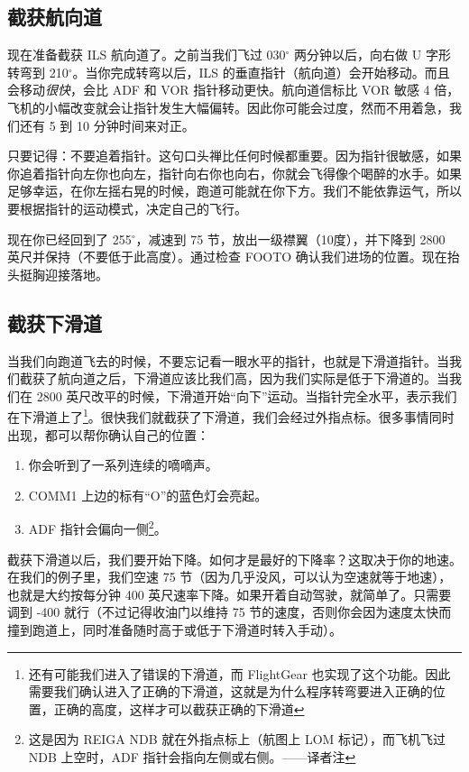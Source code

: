 \subsection{截获航向道}

现在准备截获 ILS 航向道了。之前当我们飞过 030$^\circ$ 两分钟以后，向右做 U 字形转弯到 210$^\circ$。当你完成转弯以后，ILS 的垂直指针（航向道）会开始移动。而且会移动\emph{很快}，会比 ADF 和 VOR 指针移动更快。航向道信标比 VOR 敏感 4 倍，飞机的小幅改变就会让指针发生大幅偏转。因此你可能会过度，然而不用着急，我们还有 5 到 10 分钟时间来对正。

只要记得：不要追着指针。这句口头禅比任何时候都重要。因为指针很敏感，如果你追着指针向左你也向左，指针向右你也向右，你就会飞得像个喝醉的水手。如果足够幸运，在你左摇右晃的时候，跑道可能就在你下方。我们不能依靠运气，所以要根据指针的运动模式，决定自己的飞行。

现在你已经回到了 255$^\circ$，减速到 75 节，放出一级襟翼（10度），并下降到 2800 英尺并保持（不要低于此高度）。通过检查 FOOTO 确认我们进场的位置。现在抬头挺胸迎接落地。

\subsection{截获下滑道}

当我们向跑道飞去的时候，不要忘记看一眼水平的指针，也就是下滑道指针。当我们截获了航向道之后，下滑道应该比我们高，因为我们实际是低于下滑道的。当我们在 2800 英尺改平的时候，下滑道开始“向下”运动。当指针完全水平，表示我们在下滑道上了\footnote{还有可能我们进入了错误的下滑道，而 FlightGear 也实现了这个功能。因此需要我们确认进入了正确的下滑道，这就是为什么程序转弯要进入正确的位置，正确的高度，这样才可以截获正确的下滑道}。很快我们就截获了下滑道，我们会经过外指点标。很多事情同时出现，都可以帮你确认自己的位置：

\begin{enumerate}
\item 你会听到了一系列连续的嘀嘀声。
\item COMM1 上边的标有“O”的蓝色灯会亮起。
\item ADF 指针会偏向一侧\footnote{这是因为 REIGA NDB 就在外指点标上（航图上 LOM 标记），而飞机飞过 NDB 上空时，ADF 指针会指向左侧或右侧。——译者注}。
\end{enumerate}

截获下滑道以后，我们要开始下降。如何才是最好的下降率？这取决于你的地速。在我们的例子里，我们空速 75 节（因为几乎没风，可以认为空速就等于地速），也就是大约按每分钟 400 英尺速率下降。如果开着自动驾驶，就简单了。只需要调到 -400 就行（不过记得收油门以维持 75 节的速度，否则你会因为速度太快而撞到跑道上，同时准备随时高于或低于下滑道时转入手动）。

